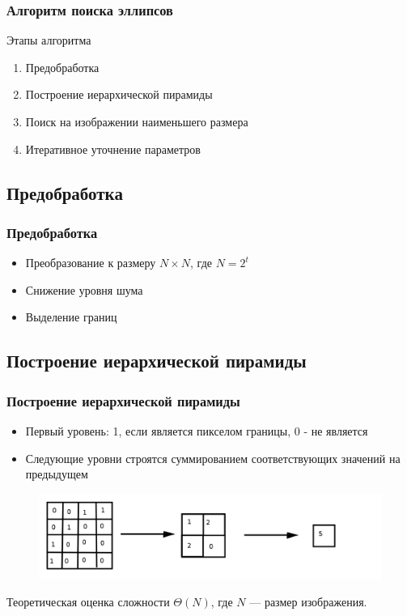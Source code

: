 \documentclass[14pt]{beamer}
\begin{document}
\begin{frame}
\frametitle{Алгоритм поиска эллипсов}
\begin{block}{Этапы алгоритма}
\begin{enumerate}
  \item Предобработка
  \item Построение иерархической пирамиды
  \item Поиск на изображении наименьшего размера
  \item Итеративное уточнение параметров
\end{enumerate}
\end{block}
\end{frame}

\subsection{Предобработка}
\begin{frame}
\frametitle{Предобработка}
\begin{block}{}
\begin{itemize}
  \item Преобразование к размеру $N \times N$, где $N = 2^t$
  \item Снижение уровня шума
  \item Выделение границ
\end{itemize}
\end{block}
\end{frame}

\subsection{Построение иерархической пирамиды}
\begin{frame}
\frametitle{Построение иерархической пирамиды}
\begin{block}{}
\begin{itemize}
  \item Первый уровень: 1, если является пикселом границы, 0 - не является
  \item Следующие уровни строятся суммированием соответствующих значений на предыдущем
\end{itemize}
\end{block}
\begin{figure}[H]
  \center
  \includegraphics[width=0.7\linewidth]{pyramidcreation}
\end{figure}
\begin{block}{Теоретическая оценка сложности}
\(\Theta(N)\), где $N$ --- размер изображения.
\end{block}
\end{frame}
\end{document}
